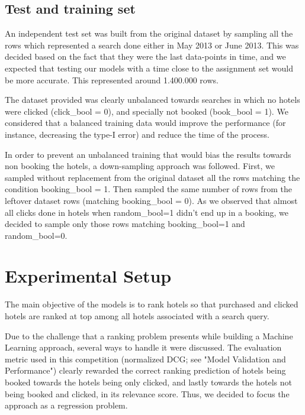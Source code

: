 \documentclass[9pt]{llncs}
\begin{document}
\subsection{Test and training set}
An independent test set was built from the original dataset by sampling all the rows which represented a search done either in May 2013 or June 2013. This was decided based on the fact that they were the last data-points in time, and we expected that testing our models with a time close to the assignment set would be more accurate.
This represented around 1.400.000 rows.


The dataset provided was clearly unbalanced towards searches in which no hotels were clicked (click\_bool = 0), and specially not booked (book\_bool = 1). We considered that a balanced training data would improve the performance (for instance, decreasing the type-I error) and reduce the time of the process.

In order to prevent an unbalanced training that would bias the results towards non booking the hotels, a down-sampling approach was followed. 
First, we sampled without replacement from the original dataset all the rows matching the condition booking\_bool = 1. Then sampled the same number of rows from the leftover dataset rows (matching booking\_bool = 0). As we observed that almost all clicks done in hotels when random\_bool=1 didn't end up in a booking, we decided to sample only those rows matching booking\_bool=1 and random\_bool=0.

\section{Experimental Setup}
The main objective of the models is to rank hotels so that purchased and clicked hotels are ranked at top among all hotels associated with a search query.

Due to the challenge that a ranking problem presents while building a Machine Learning approach, several ways to handle it were discussed. The evaluation metric used in this competition (normalized DCG; see "Model Validation and Performance") clearly rewarded the correct ranking prediction of hotels being booked towards the hotels being only clicked, and lastly towards the hotels not being booked and clicked, in its relevance score. Thus, we decided to focus the approach as a regression problem.
\end{document}
